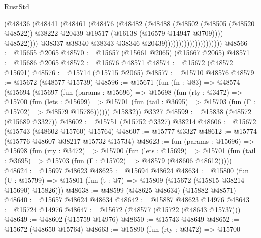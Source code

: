 \begin{lexlean}{RustStd}
\begin{coremodule}
                                            (@48436
                                              (@48441
                                                (@48461
                                                  (@48476
                                                    (@48482
                                                      (@48488
                                                        (@48502
                                                          (@48505 (@48520 @48522))
                                                          @38222
                                                          @20439
                                                          @19517
                                                          (@16138 (@16579 @14947 @3709))))
                                                      @48522))))
                                              @38337
                                              @38340
                                              @38343
                                              @38346
                                              @20439)))))))))))))))))))))
@48566 := @15655 @2065
@48570 := @15657 (@15661 @2065) (@15667 @2065)
@48571 := @15686 @2065
@48572 := @15676 @48571
@48574 := @15672 (@48572 @15691)
@48576 := @15714 (@15715 @2065)
@48577 := @15710 @48576
@48579 := @15672 (@48577 @15739)
@48596 := @15671
    (fun (fn : @83) =>
    @48574
      (@15694
        (@15697
          (fun (params : @15696) =>
          @15698
            (fun (rty : @3472) =>
            @15700
              (fun (lets : @15699) =>
              @15701 (fun (tail : @3695) => @15703 (fun (Γ : @15702) => @48579 @15786))))))
        @15832))
    @3327
@48599 := @15838 (@48572 (@15689 @3327))
@48602 := @15751 (@15752 @3327) @38214
@48606 := @15672 (@15743 (@48602 @15760) @15764)
@48607 := @15777 @3327
@48612 := @15774 (@15776 @48607 @38217 @15732 @15734)
@48623 := fun (params : @15696) =>
  @15698
    (fun (rty : @3472) =>
    @15700
      (fun (lets : @15699) =>
      @15701 (fun (tail : @3695) => @15703 (fun (Γ : @15702) => @48579 (@48606 @48612)))))
@48624 := @15697 @48623
@48625 := @15694 @48624
@48634 := @15800
    (fun (U : @15799) => @15801 (fun (t : @7) => @15809 (@15672 (@15815 @38214 @15690) @15826)))
@48638 := @48599 (@48625 @48634) (@15882 @48571)
@48640 := @15657 @48624 @48634
@48642 := @15887 @48623 @14976
@48643 := @15724 @14976
@48647 := @15672 (@48577 (@15722 (@48643 @15737)))
@48649 := @48602 (@15759 @14976)
@48650 := @15743 @48649
@48652 := @15672 (@48650 @15764)
@48663 := @15890
    (fun (rty : @3472) =>
    @15700

\end{coremodule}
\end{lexlean}
